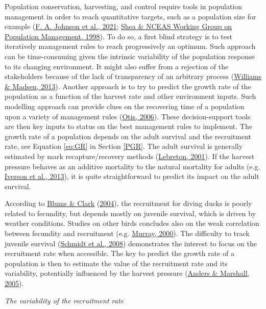 \documentclass[
  english,
]{article}
\begin{document}
Population conservation, harvesting, and control require tools in population management in order to reach quantitative targets, such as a population size for example (\protect\hyperlink{ref-Johnson2021}{F. A. Johnson et al., 2021}; \protect\hyperlink{ref-Shea1998}{Shea \& NCEAS Working Group on Population Management, 1998}). To do so, a first blind strategy is to test iteratively management rules to reach progressively an optimum. Such approach can be time-consuming given the intrinsic variability of the population response to its changing environment. It might also suffer from a rejection of the stakeholders because of the lack of transparency of an arbitrary process (\protect\hyperlink{ref-Williams2013}{Williams \& Madsen, 2013}). Another approach is to try to predict the growth rate of the population as a function of the harvest rate and other environment inputs. Such modelling approach can provide clues on the recovering time of a population upon a variety of management rules (\protect\hyperlink{ref-Otis2006}{Otis, 2006}). These decision-support tools are then key inputs to status on the best management rules to implement. The growth rate of a population depends on the adult survival and the recruitment rate, see Equation \eqref{eq:GR} in Section \ref{PGR}. The adult survival is generally estimated by mark recapture/recovery methods (\protect\hyperlink{ref-Lebreton2001}{Lebreton, 2001}). If the harvest pressure behaves as an additive mortality to the natural mortality for adults (e.g. \protect\hyperlink{ref-Iverson2013}{Iverson et al., 2013}), it is quite straightforward to predict its impact on the adult survival.

According to \protect\hyperlink{ref-Blums2004}{Blums \& Clark} (\protect\hyperlink{ref-Blums2004}{2004}), the recruitment for diving ducks is poorly related to fecundity, but depends mostly on juvenile survival, which is driven by weather conditions. Studies on other birds concludes also on the weak correlation between fecundity and recruitment (e.g. \protect\hyperlink{ref-Murray2000}{Murray, 2000}). The difficulty to track juvenile survival (\protect\hyperlink{ref-Schmidt2008}{Schmidt et al., 2008}) demonstrates the interest to focus on the recruitment rate when accessible. The key to predict the growth rate of a population is then to estimate the value of the recruitment rate and its variability, potentially influenced by the harvest pressure (\protect\hyperlink{ref-Anders2005}{Anders \& Marshall, 2005}).

\emph{The variability of the recruitment rate}
\end{document}
